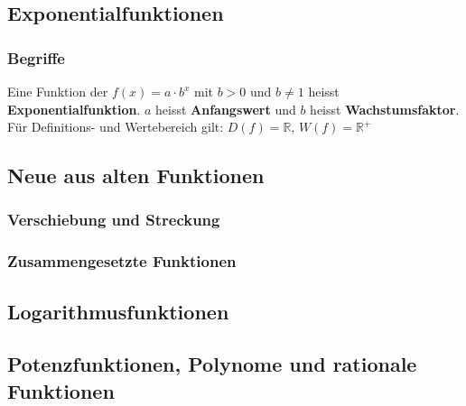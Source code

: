 \subsection{Exponentialfunktionen}
\subsubsection{Begriffe}Eine Funktion der $f(x)=a\cdot b^x$ mit $b>0$ und $b\neq 1$ heisst \textbf{Exponentialfunktion}. $a$ heisst \textbf{Anfangswert} und $b$ heisst \textbf{Wachstumsfaktor}. Für Definitions- und Wertebereich gilt: $D(f)=\mathbb{R},\, W(f)=\mathbb{R^+}$


\subsection{Neue aus alten Funktionen}

\subsubsection{Verschiebung und Streckung}

\subsubsection{Zusammengesetzte Funktionen}

\subsection{Logarithmusfunktionen}

\subsection{Potenzfunktionen, Polynome und rationale Funktionen}
